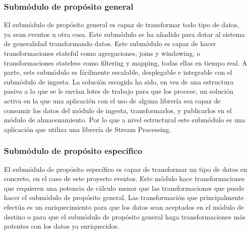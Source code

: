\subsubsection{Submódulo de propósito general}
El submódulo de propósito general es capaz de transformar todo tipo de datos, ya sean eventos u otra cosa. Este submódulo se ha añadido para dotar al sistema de generalidad transformando datos. Este submódulo es capaz de hacer transformaciones stateful como agregaciones, joins y windowing, o transformaciones stateless como filtering y mapping, todas ellas en tiempo real. A parte, este submódulo es fácilmente escalable, desplegable e integrable con el submódulo de ingesta. La solución escogida ha sido, en vez de una estructura pasiva a la que se le envían lotes de trabajo para que los procese, un solución activa en la que una aplicación con el uso de alguna librería sea capaz de consumir los datos del módulo de ingesta, transformarlos, y publicarlos en el módulo de almacenamiento. Por lo que a nivel estructural este submódulo es una aplicación que utiliza una librería de Stream Processing.

\subsubsection{Submódulo de propósito específico}
El submódulo de propósito específico es capaz de transformar un tipo de datos en concreto, en el caso de este proyecto eventos. Este módulo hace transformaciones que requieren una potencia de cálculo menor que las transformaciones que puede hacer el submódulo de propósito general. Las transformación que principalmente efectúa es un enriquecimiento para que los datos sean aceptados en el módulo de destino o para que el submódulo de propósito general haga transformaciones más potentes con los datos ya enriquecidos. \\\\


